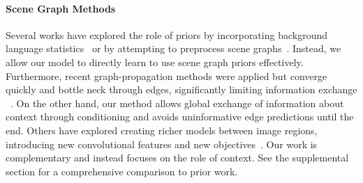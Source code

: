\documentclass[10pt,twocolumn,letterpaper]{article}
\begin{document}
\paragraph{Scene Graph Methods}
Several works have explored the role of priors by incorporating background language statistics~\cite{lu_visual_2016, Yu_2017_ICCV} or by attempting to preprocess scene graphs~\cite{zhang_learning_2016}.
Instead, we allow our model to directly learn to use scene graph priors effectively. 
Furthermore, recent graph-propagation methods were applied but converge quickly and bottle neck through edges, significantly limiting information exchange ~\cite{xu_scene_2017, li2017msdn, Dai2017DetectingVR, li2017vip}.
On the other hand, our method allows global exchange of information about context through conditioning and avoids uninformative edge predictions until the end.
Others have explored creating richer models between image regions, introducing new convolutional features and new objectives~\cite{DBLP:journals/corr/NewellD17,Zhang2017VisualTE, li2017msdn, liang_deep_2017}. Our work is complementary and instead focuses on the role of context. See the supplemental section for a comprehensive comparison to prior work. 
\end{document}
